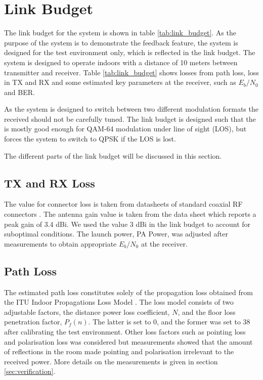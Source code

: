 \section{Link Budget}
\label{sec:link_budget}
The link budget for the system is shown in table \ref{tab:link_budget}. As the purpose of the system is to demonstrate the feedback feature, the system is designed for the test environment only, which is reflected in the link budget. The system is designed to operate indoors with a distance of 10 meters between transmitter and receiver. Table \ref{tab:link_budget} shows losses from path loss, loss in TX and RX and some estimated key parameters at the receiver, such as $E_b/N_0$ and BER. 



As the system is designed to switch between two different modulation formats the received \ebnot should not be carefully tuned. The link budget is designed such that the \ebnot is mostly good enough for QAM-64 modulation under line of sight (LOS), but forces the system to switch to QPSK if the LOS is lost. 

The different parts of the link budget will be discussed in this section.

\subsection{TX and RX Loss}
\label{sec:txandrxloss}
The value for connector loss is taken from datasheets of standard coaxial RF connectors \cite{rfconnector}. The antenna gain value is taken from the data sheet \cite{antenna} which reports a peak gain of 3.4 dBi. We used the value 3 dBi in the link budget to account for suboptimal conditions. The launch power, PA Power, was adjusted after measurements to obtain appropriate $E_b/N_0$ at the receiver.

\subsection{Path Loss}
\label{sec:path_loss}
The estimated path loss constitutes solely of the propagation loss obtained from the ITU Indoor Propagations Loss Model \cite{itu_model}. The loss model consists of two adjustable factors, the distance power loss coefficient, $N$, and the floor loss penetration factor, $P_f(n)$. The latter is set to 0, and the former was set to 38 after calibrating the test environment. Other loss factors such as pointing loss and polarisation loss was considered but measurements showed that the amount of reflections in the room made pointing and polarisation irrelevant to the received power. More details on the measurements is given in section \ref{sec:verification}. 

